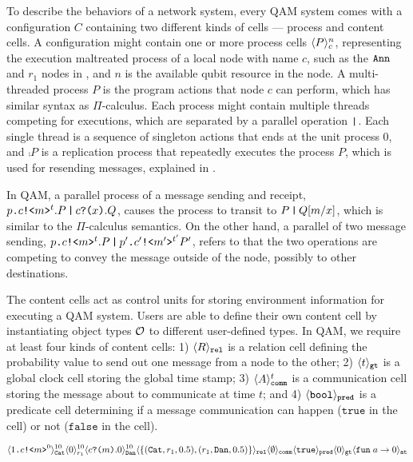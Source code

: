 To describe the behaviors of a network system, every QAM system comes with a configuration $C$
containing two different kinds of cells --- process and content cells.
A configuration might contain one or more process cells $\langle P \rangle^{n}_{c}$, representing the execution maltreated process of a local node with name $c$, such as the $\texttt{Ann}$ and $r_1$ nodes in ,
and $n$ is the available qubit resource in the node.
A multi-threaded process $P$ is the program actions that node $c$ can perform, which has similar syntax as $\Pi$-calculus.
Each process might contain multiple threads competing for executions, which are separated by a parallel operation $\texttt{|}$.
Each single thread is a sequence of singleton actions that ends at the unit process $0$,
and $\comp{P}$ is a replication process that repeatedly executes the process $P$, 
which is used for resending messages, explained in .

In QAM, a parallel process of a message sending and receipt, $p\texttt{.}c\texttt{!<}m\texttt{>}^t.P\,\texttt{|}\,c\texttt{?(}x\texttt{)}.Q$,
causes the process to transit to $P\,\texttt{|}\,Q[m/x]$, which is similar to the $\Pi$-calculus semantics.
On the other hand, a parallel of two message sending, $p\texttt{.}c\texttt{!<}m\texttt{>}^t.P\,\texttt{|}\,p'\texttt{.}c'\texttt{!<}m'\texttt{>}^{t'}{P'}$,
refers to that the two operations are competing to convey the message outside of the node, possibly to other destinations.

The content cells act as control units for storing environment information for executing a QAM system.
Users are able to define their own content cell by instantiating object types $\mathcal{O}$ to different user-defined types.
In QAM, we require at least four kinds of content cells: 
1) $\langle R \rangle_{\texttt{rel}}$ is a relation cell defining the probability value to send out one message from a node to the other;
2) $\langle t \rangle_{\texttt{gt}}$ is a global clock cell storing the global time stamp;
3) $\langle A \rangle^{t}_{\texttt{comm}}$ is a communication cell storing the message about to communicate at time $t$;
and 4) $\langle \texttt{bool} \rangle_{\texttt{pred}}$ is a predicate cell 
determining if a message communication can happen ($\texttt{true}$ in the cell) or not ($\texttt{false}$ in the cell).

{\footnotesize
\[
\langle 1\texttt{.}c\texttt{!<}m\texttt{>}^0 \rangle^{10}_{\texttt{Cat}}\langle 0 \rangle^{10}_{r_1}
\langle c\texttt{?(}m\texttt{)}.0 \rangle^{10}_{\texttt{Dan}} 
\langle \{(\texttt{Cat},r_1,0.5), (r_1,\texttt{Dan},0.5)\} \rangle_{\texttt{rel}}
\langle \emptyset \rangle_{\texttt{comm}}
\langle \texttt{true} \rangle_{\texttt{pred}}
\langle 0 \rangle_{\texttt{gt}}
\langle \texttt{fun}\;a\to 0 \rangle_{\texttt{at}}
\]
}

